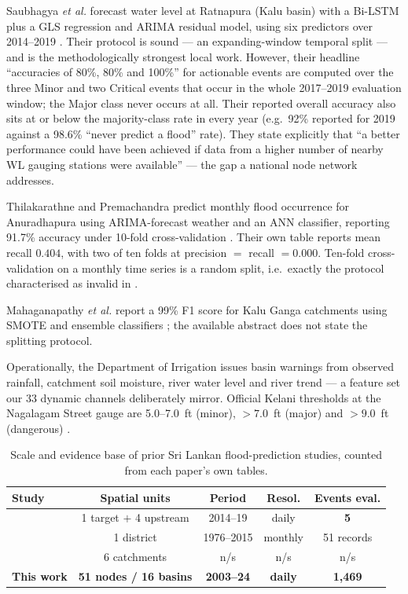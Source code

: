 \documentclass[conference]{IEEEtran}
\begin{document}
Saubhagya \emph{et al.} forecast water level at Ratnapura (Kalu basin) with a
Bi-LSTM plus a GLS regression and ARIMA residual model, using six predictors over
2014--2019 \cite{saubhagya2025}. Their protocol is sound --- an expanding-window
temporal split --- and is the methodologically strongest local work. However,
their headline ``accuracies of 80\%, 80\% and 100\%'' for actionable events are
computed over the three Minor and two Critical events that occur in the whole
2017--2019 evaluation window; the Major class never occurs at all. Their reported
overall accuracy also sits at or below the majority-class rate in every year
(e.g.\ 92\% reported for 2019 against a 98.6\% ``never predict a flood'' rate).
They state explicitly that ``a better performance could have been achieved if
data from a higher number of nearby WL gauging stations were available''
\cite{saubhagya2025} --- the gap a national node network addresses.

Thilakarathne and Premachandra predict monthly flood occurrence for Anuradhapura
using ARIMA-forecast weather and an ANN classifier, reporting 91.7\% accuracy
under 10-fold cross-validation \cite{thilakarathne2017}. Their own table reports
mean recall $0.404$, with two of ten folds at precision $=$ recall $=0.000$.
Ten-fold cross-validation on a monthly time series is a random split, i.e.\
exactly the protocol characterised as invalid in \cite{roberts2017,kapoor2023}.

Mahaganapathy \emph{et al.} report a 99\% F1 score for Kalu Ganga catchments using
SMOTE and ensemble classifiers \cite{mahaganapathy2023}; the available abstract
does not state the splitting protocol.

Operationally, the Department of Irrigation issues basin warnings from observed
rainfall, catchment soil moisture, river water level and river trend
\cite{doi2024} --- a feature set our 33 dynamic channels deliberately mirror.
Official Kelani thresholds at the Nagalagam Street gauge are 5.0--7.0~ft (minor),
$>7.0$~ft (major) and $>9.0$~ft (dangerous) \cite{gunasekara2008}.

\begin{table}[t]
\caption{Scale and evidence base of prior Sri Lankan flood-prediction studies,
counted from each paper's own tables.}
\label{tab:lk}
\centering
\footnotesize
\begin{tabular}{@{}lcccc@{}}
\toprule
Study & Spatial units & Period & Resol. & Events eval. \\
\midrule
\cite{saubhagya2025} & 1 target $+$ 4 upstream & 2014--19 & daily & \textbf{5} \\
\cite{thilakarathne2017} & 1 district & 1976--2015 & monthly & 51 records \\
\cite{mahaganapathy2023} & 6 catchments & n/s & n/s & n/s \\
\textbf{This work} & \textbf{51 nodes / 16 basins} & \textbf{2003--24} & \textbf{daily} & \textbf{1{,}469} \\
\bottomrule
\end{tabular}
\end{table}
\end{document}
